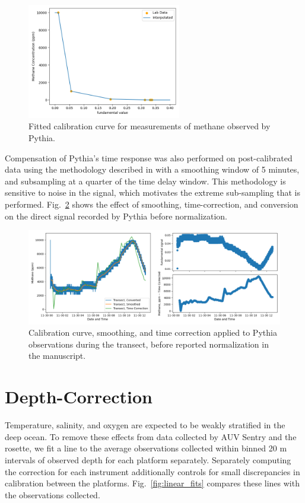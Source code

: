\begin{figure}[h!]
    \centering
    \includegraphics[width=0.6\textwidth]{figures/nopp_fundamental_calib_inverted.png}
    \caption{Fitted calibration curve for measurements of methane observed by Pythia.}
    \label{fig:nopp_curve}
\end{figure}

Compensation of Pythia's time response was also performed on post-calibrated data using the methodology described in \cite{miloshevich2004development} with a smoothing window of 5 minutes, and subsampling at a quarter of the time delay window. This methodology is sensitive to noise in the signal, which motivates the extreme sub-sampling that is performed. Fig.~\ref{fig:fund_corrected} shows the effect of smoothing, time-correction, and conversion on the direct signal recorded by Pythia before normalization. 

\begin{figure}[h!]
    \centering
    \includegraphics[width=1\textwidth]{figures/pythia_calibration.png}
    \caption{Calibration curve, smoothing, and time correction applied to Pythia observations during the transect, before reported normalization in the manuscript.}
    \label{fig:fund_corrected}
\end{figure}


\section{Depth-Correction}
\label{app:perception:depth}
Temperature, salinity, and oxygen are expected to be weakly stratified in the deep ocean. To remove these effects from data collected by AUV Sentry and the rosette, we fit a line to the average observations collected within binned 20 m intervals of observed depth for each platform separately. Separately computing the correction for each instrument additionally controls for small discrepancies in calibration between the platforms. Fig.~\ref{fig:linear_fits} compares these lines with the observations collected.

